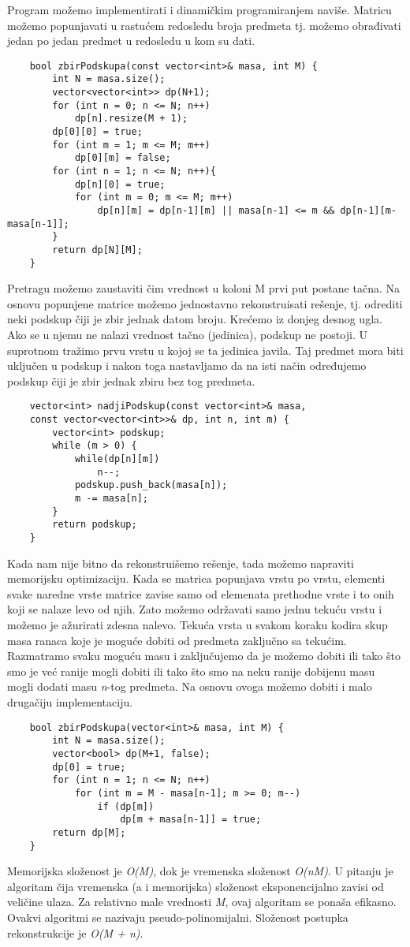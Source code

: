 \documentclass{article}
\begin{document}
Program možemo implementirati i dinamičkim programiranjem naviše. Matricu
možemo popunjavati u rastućem redosledu broja predmeta tj. možemo obrađivati
jedan po jedan predmet u redosledu u kom su dati.
\begin{lstlisting}
    bool zbirPodskupa(const vector<int>& masa, int M) {
        int N = masa.size();
        vector<vector<int>> dp(N+1);
        for (int n = 0; n <= N; n++)
            dp[n].resize(M + 1);
        dp[0][0] = true;
        for (int m = 1; m <= M; m++)
            dp[0][m] = false;
        for (int n = 1; n <= N; n++){
            dp[n][0] = true;
            for (int m = 0; m <= M; m++)
                dp[n][m] = dp[n-1][m] || masa[n-1] <= m && dp[n-1][m-masa[n-1]];
        }
        return dp[N][M];
    }
\end{lstlisting}
Pretragu možemo zaustaviti čim vrednost u koloni M prvi put postane
tačna.
Na osnovu popunjene matrice možemo jednostavno rekonstruisati rešenje, tj.
odrediti neki podskup čiji je zbir jednak datom broju. Krećemo iz donjeg desnog
ugla. Ako se u njemu ne nalazi vrednost tačno (jedinica), podskup ne postoji. U
suprotnom tražimo prvu vrstu u kojoj se ta jedinica javila. Taj predmet mora
biti uključen u podskup i nakon toga nastavljamo da na isti način određujemo
podskup čiji je zbir jednak zbiru bez tog predmeta.
\begin{lstlisting}
    vector<int> nadjiPodskup(const vector<int>& masa,
    const vector<vector<int>>& dp, int n, int m) {
        vector<int> podskup;
        while (m > 0) {
            while(dp[n][m])
                n--;
            podskup.push_back(masa[n]);
            m -= masa[n];
        }
        return podskup;
    }
\end{lstlisting}
Kada nam nije bitno da rekonstruišemo rešenje, tada možemo napraviti memorijsku optimizaciju. Kada se matrica popunjava vrstu po vrstu, elementi svake
naredne vrste matrice zavise samo od elemenata prethodne vrste i to onih koji se
nalaze levo od njih. Zato možemo održavati samo jednu tekuću vrstu i možemo
je ažurirati zdesna nalevo. Tekuća vrsta u
svakom koraku kodira skup masa ranaca koje je moguće dobiti od predmeta
zaključno sa tekućim. Razmatramo svaku moguću masu i zaključujemo da je
možemo dobiti ili tako što smo je već ranije mogli dobiti ili tako što smo na
neku ranije dobijenu masu mogli dodati masu \textit{n}-tog predmeta. Na osnovu ovoga
možemo dobiti i malo drugačiju implementaciju.
\begin{lstlisting}
    bool zbirPodskupa(vector<int>& masa, int M) {
        int N = masa.size();
        vector<bool> dp(M+1, false);
        dp[0] = true;
        for (int n = 1; n <= N; n++)
            for (int m = M - masa[n-1]; m >= 0; m--)
                if (dp[m])
                    dp[m + masa[n-1]] = true;
        return dp[M];
    }
\end{lstlisting}
Memorijska složenost je \textit{O(M)}, dok je vremenska složenost
\textit{O(nM)}. U pitanju je algoritam čija vremenska (a i memorijska) složenost eksponencijalno zavisi od
veličine ulaza. Za relativno male vrednosti \textit{M}, ovaj algoritam se ponaša
efikasno. Ovakvi algoritmi se nazivaju pseudo-polinomijalni. Složenost postupka
rekonstrukcije je \textit{O(M + n)}.
\end{document}
